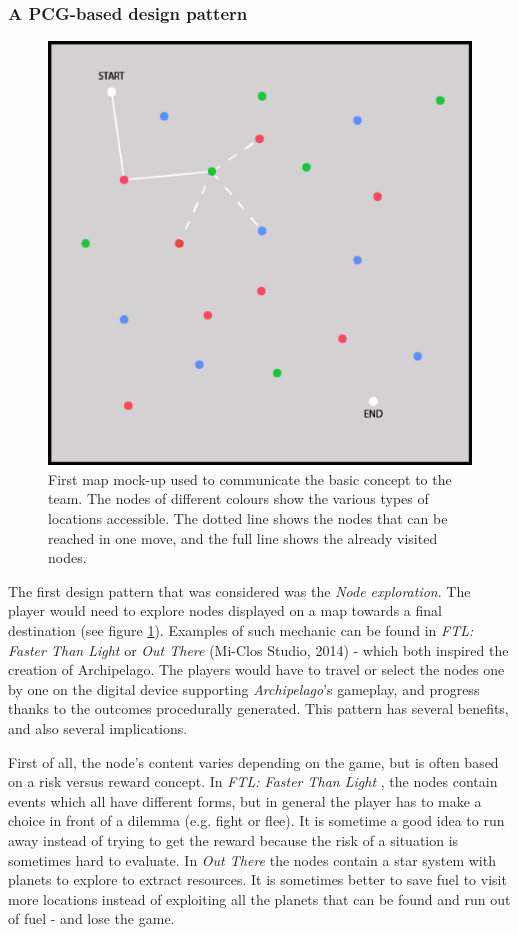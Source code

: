 \subsubsection{A PCG-based design pattern}
\begin{figure}[h]
    \centering
    \includegraphics[scale=0.4]{Images/protomap.png}
    \caption{First map mock-up used to communicate the basic concept to the team. The nodes of different colours show the various types of locations accessible. The dotted line shows the nodes that can be reached in one move, and the full line shows the already visited nodes.}
    \label{fig:map}
\end{figure}
The first design pattern that was considered  was the \textit{Node exploration}. The player would need to explore nodes displayed on a map towards a final destination (see figure \ref{fig:map}). Examples of such mechanic can be found in \textit{FTL: Faster Than Light} \cite{game:ftl} or \textit{Out There} (Mi-Clos Studio, 2014) \cite{game:outthere} - which both inspired the creation of Archipelago. The players would have to travel or select the nodes one by one on the digital device supporting  \textit{Archipelago}'s gameplay, and progress thanks to the outcomes procedurally generated. This pattern has several benefits, and also several implications. 

First of all, the node's content varies depending on the game, but is often based on a risk versus reward concept. In \textit{FTL: Faster Than Light} \cite{game:ftl}, the nodes contain events which all have different forms, but in general the player has to make a choice in front of a dilemma (e.g. fight or flee). It is sometime a good idea to run away instead of trying to get the reward because the risk of a situation is sometimes hard to evaluate. In \textit{Out There} \cite{game:outthere} the nodes contain a star system with planets to explore to extract resources. It is sometimes better to save fuel to visit more locations instead of exploiting all the planets that can be found and run out of fuel - and lose the game.  

